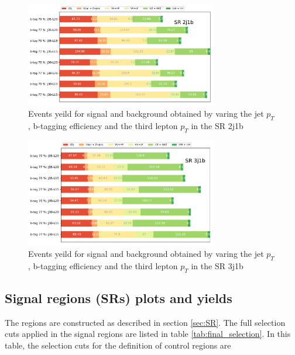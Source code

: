 \begin{figure}[h!]
    \centering
    \includegraphics[width=0.75\textwidth]{ubonn-thesis/Chapters/Chapters_05/Figure/Cuts Optimization/jet_2j1b_yield.pdf}
    \caption{Events yeild for signal and background obtained by varing the jet $p_{T}$, b-tagging efficiency and the third lepton $p_{T}$ in the SR 2j1b}
    \label{fig:SR_2j1bbtag}
\end{figure}

\begin{figure}[h!]
    \centering
    \includegraphics[width=0.75\textwidth]{ubonn-thesis/Chapters/Chapters_05/Figure/Cuts Optimization/jet_3j1b_yield.pdf}
    \caption{Events yeild for signal and background obtained by varing the jet $p_{T}$, b-tagging efficiency and the third lepton $p_{T}$ in the SR 3j1b}
    \label{fig:SR_3j1btag}
\end{figure}



\subsection{Signal regions (SRs) plots and yields}
\label{subsec:SR_plot_yield}

The regions are constructed as described in section \ref{sec:SR}. The full selection cuts applied in the signal regions are listed in table \ref{tab:final_selection}. In this table, the selection cuts for the definition of control regions are  

